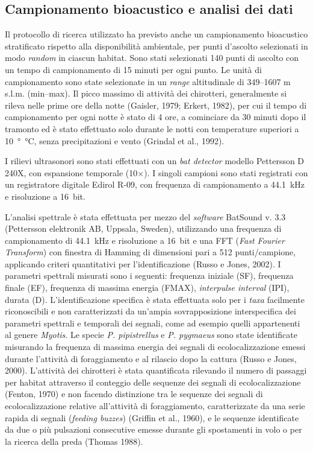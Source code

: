 \begin{multicols}{2}
\subsection*{Campionamento bioacustico e analisi dei dati}
Il protocollo di ricerca utilizzato ha previsto anche un campionamento bioacustico stratificato rispetto alla disponibilità ambientale, per punti d’ascolto selezionati in modo \textit{random} in ciascun habitat. Sono stati selezionati 140 punti di ascolto con un tempo di campionamento di 15 minuti per ogni punto. Le unità di campionamento sono state selezionate in un \textit{range} altitudinale di 349--1607 m s.l.m. (min--max). Il picco massimo di attività dei chirotteri, generalmente si rileva nelle prime ore della notte (Gaisler, 1979; Erkert, 1982), per cui il tempo di campionamento per ogni notte è stato di 4 ore, a cominciare da 30 minuti dopo il tramonto ed è stato effettuato solo durante le notti con temperature superiori a \SI{10}{\degree\celsius}, senza precipitazioni e vento (Grindal et al., 1992).

I rilievi ultrasonori sono stati effettuati con un \textit{bat detector} modello Pettersson D 240X, con espansione temporale (10$\times$). I singoli campioni sono stati registrati con un registratore digitale Edirol R-09, con frequenza di campionamento a 44.1~kHz e risoluzione a 16~bit.

L’analisi spettrale è stata effettuata per mezzo del \textit{software} BatSound v. 3.3 (Pettersson elektronik AB, Uppsala, Sweden), utilizzando una frequenza di campionamento di 44.1~kHz e risoluzione a 16~bit e una FFT (\textit{Fast Fourier Transform}) con finestra di Hamming di dimensioni pari a 512 punti/campione, applicando criteri quantitativi per l’identificazione (Russo e Jones, 2002). I parametri spettrali misurati sono i seguenti: frequenza iniziale (SF), frequenza finale (EF), frequenza di massima energia (FMAX), \textit{interpulse interval} (IPI), durata (D). L’identificazione specifica è stata effettuata solo per i \textit{taxa} facilmente riconoscibili e non caratterizzati da un’ampia sovrapposizione interspecifica dei parametri spettrali e temporali dei segnali, come ad esempio quelli appartenenti al genere \emph{Myotis}. Le specie \emph{P. pipistrellus} e \emph{P. pygmaeus} sono state identificate misurando la frequenza di massima energia dei segnali di ecolocalizzazione emessi durante l’attività di foraggiamento e al rilascio dopo la cattura (Russo e Jones, 2000). L’attività dei chirotteri è stata quantificata rilevando il numero di passaggi per habitat attraverso il conteggio delle sequenze dei segnali di ecolocalizzazione (Fenton, 1970) e non facendo distinzione tra le sequenze dei segnali di ecolocalizzazione relative all’attività di foraggiamento, caratterizzate da una serie rapida di segnali (\emph{feeding buzzes}) (Griffin et al., 1960), e le sequenze identificate da due o più pulsazioni consecutive emesse durante gli spostamenti in volo o per la ricerca della preda (Thomas 1988).


\end{multicols}
